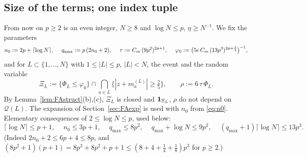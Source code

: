 \subsection{Size of the terms; one index tuple}\label{sec:FAsize}
From now on $p\ge2$ is an even integer, $N\ge8$ and $\log N\le p$, $\eta\ge N^{-1}$. We fix the parameters
\begin{equation}\label{eq:n0}
 n_0:=2p+\lceil\log N\rceil,\quad\ q_{\max}:=p\,(2n_0+2),\quad\ \tau:=C_m\,(9p^2)^{2\fa+1},\quad\ \varphi_0:=\big(5e\,C_m\,(13p^3)^{2\fa+\frac32}\big)^{-1},
\end{equation}
and for $L\subset\{1,\dots,N\}$ with $1\le|L|\le p$, $|L|<N$, the event and the random variable
\begin{equation}\label{eq:XiL}
 \Xi_L:=\{\Phi_L\le\varphi_0\}\cap\bigcap_{a\in L}\big\{|z+m_a^{(L)}|\ge\tfrac25\big\},\qquad\rho:=6\,\tau\,\Phi_L .
\end{equation}
By Lemma~\ref{lem:FAstruct}(b),(c), $\Xi_L$ is closed and $\mathbf{1}_{\Xi_L}$, $\rho$ do not depend on $\mathcal Q(L)$. The expansion of Section~\ref{sec:FAexp} is used with $n_0$ from \eqref{eq:n0}. Elementary consequences of $2\le\log N\le p$, used below:
\begin{equation}\label{eq:elem}
 \lceil\log N\rceil\le p+1,\quad\ n_0\le3p+1,\quad\ q_{\max}\le8p^2,\quad\ q_{\max}+\log N\le9p^2,\quad\ (q_{\max}+1)\lceil\log N\rceil\le13p^3 .
\end{equation}
(Indeed $2n_0+2\le6p+4\le8p$, and $(8p^2+1)(p+1)=8p^3+8p^2+p+1\le(8+4+\frac14+\frac18)p^3$ for $p\ge2$.)


